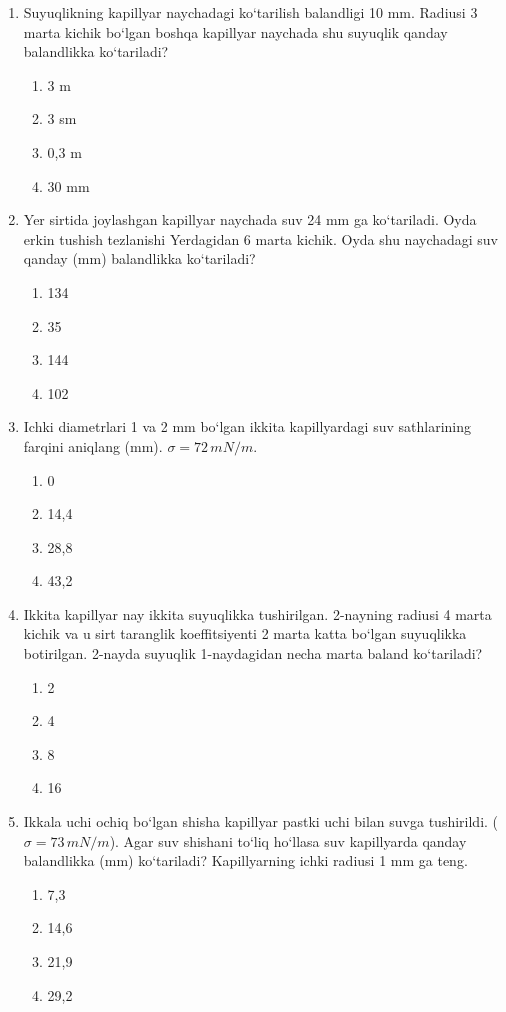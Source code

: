 \begin{enumerate}
\item Suyuqlikning kapillyar naychadagi ko‘tarilish balandligi 10 mm. Radiusi 3 marta kichik bo‘lgan boshqa kapillyar naychada shu suyuqlik qanday balandlikka ko‘tariladi?
\begin{enumerate}[label=\Alph*)]
\item 3 m
\item 3 sm
\item 0,3 m
\item 30 mm
\end{enumerate}

\item Yer sirtida joylashgan kapillyar naychada suv 24 mm ga ko‘tariladi. Oyda erkin tushish tezlanishi Yerdagidan 6 marta kichik. Oyda shu naychadagi suv qanday (mm) balandlikka ko‘tariladi?
\begin{enumerate}[label=\Alph*)]
\item 134
\item 35
\item 144
\item 102
\end{enumerate}

\item Ichki diametrlari 1 va 2 mm bo‘lgan ikkita kapillyardagi suv sathlarining farqini aniqlang (mm). $\sigma = 72 \, mN/m$.
\begin{enumerate}[label=\Alph*)]
\item 0
\item 14,4
\item 28,8
\item 43,2
\end{enumerate}

\item Ikkita kapillyar nay ikkita suyuqlikka tushirilgan. 2-nayning radiusi 4 marta kichik va u sirt taranglik koeffitsiyenti 2 marta katta bo‘lgan suyuqlikka botirilgan. 2-nayda suyuqlik 1-naydagidan necha marta baland ko‘tariladi?
\begin{enumerate}[label=\Alph*)]
\item 2
\item 4
\item 8
\item 16
\end{enumerate}

\item Ikkala uchi ochiq bo‘lgan shisha kapillyar pastki uchi bilan suvga tushirildi. ($\sigma = 73 \, mN/m$). Agar suv shishani to‘liq ho‘llasa suv kapillyarda qanday balandlikka (mm) ko‘tariladi? Kapillyarning ichki radiusi 1 mm ga teng.
\begin{enumerate}[label=\Alph*)]
\item 7,3
\item 14,6
\item 21,9
\item 29,2
\end{enumerate}


\end{enumerate}
